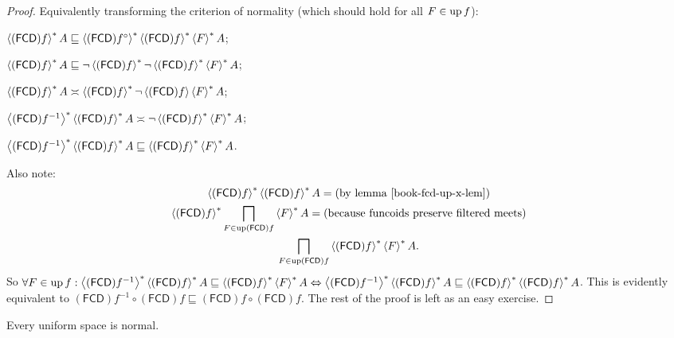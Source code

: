 \begin{proof}
  Equivalently transforming the criterion of normality (which should hold for
  all $F \in \operatorname{up} f$):
  
  $\left\langle (\mathsf{FCD}) f\right\rangle ^{\ast} A \sqsubseteq
  \left\langle (\mathsf{FCD}) f^{\circ}\right\rangle ^{\ast}
  \left\langle (\mathsf{FCD}) f\right\rangle ^{\ast} \left\langle F\right\rangle ^{\ast} A$;
  
  $\left\langle (\mathsf{FCD}) f\right\rangle ^{\ast} A \sqsubseteq \neg
  \left\langle (\mathsf{FCD}) f\right\rangle ^{\ast} \neg \left\langle  (\mathsf{FCD}) f \right\rangle ^{\ast}
  \left\langle F\right\rangle ^{\ast} A$;
  
  $\left\langle (\mathsf{FCD}) f\right\rangle ^{\ast} A \asymp
  \left\langle (\mathsf{FCD}) f\right\rangle ^{\ast} \neg \left\langle (\mathsf{FCD}) f\right\rangle \left\langle F\right\rangle ^{\ast} A$;
  
  $\left\langle (\mathsf{FCD}) f^{- 1}\right\rangle ^{\ast}
  \left\langle (\mathsf{FCD}) f\right\rangle ^{\ast} A \asymp \neg
  \left\langle (\mathsf{FCD}) f\right\rangle ^{\ast} \left\langle F\right\rangle ^{\ast} A$;
  
  $\left\langle (\mathsf{FCD}) f^{- 1}\right\rangle ^{\ast}
  \left\langle (\mathsf{FCD}) f\right\rangle ^{\ast} A \sqsubseteq
  \left\langle (\mathsf{FCD}) f\right\rangle ^{\ast} \left\langle F\right\rangle ^{\ast} A$.
  
  Also note:
  \begin{multline*}
     \rsupfun{(\mathsf{FCD}) f} \rsupfun{(\mathsf{FCD}) f} A = \text{(by lemma~\bookref{fcd-up-x-lem})} \\
     \rsupfun{(\mathsf{FCD}) f} \bigsqcap_{F \in \up (\mathsf{FCD}) f} \rsupfun{F} A = \text{(because funcoids preserve filtered meets)} \\
     \bigsqcap_{F \in \up (\mathsf{FCD}) f} \rsupfun{(\mathsf{FCD}) f} \rsupfun{F}
     A.
  \end{multline*}
  So $\forall F \in \operatorname{up} f : \left\langle  (\mathsf{FCD}) f^{- 1}
  \right\rangle ^{\ast} \left\langle (\mathsf{FCD}) f\right\rangle ^{\ast} A \sqsubseteq
  \left\langle (\mathsf{FCD}) f\right\rangle ^{\ast} \left\langle F\right\rangle ^{\ast} A
  \Leftrightarrow \left\langle (\mathsf{FCD}) f^{- 1}\right\rangle ^{\ast}
  \left\langle (\mathsf{FCD}) f\right\rangle ^{\ast} A \sqsubseteq
  \left\langle (\mathsf{FCD}) f\right\rangle ^{\ast} \left\langle (\mathsf{FCD}) f\right\rangle ^{\ast} A$. This is
  evidently equivalent to $(\mathsf{FCD}) f^{- 1} \circ
  (\mathsf{FCD}) f \sqsubseteq (\mathsf{FCD}) f \circ
  (\mathsf{FCD}) f$. The rest of the proof is left as an easy exercise.
\end{proof}

\begin{cor}
  Every uniform space is normal.
\end{cor}
